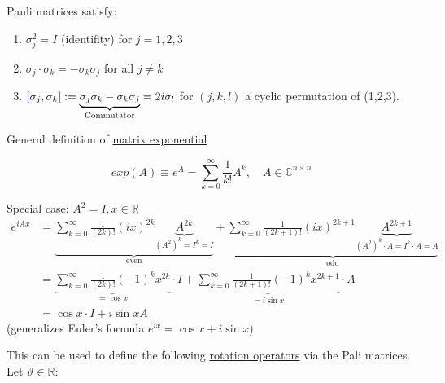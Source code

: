 Pauli matrices satisfy:
\begin{enumerate}
    \item $\sigma^{2}_{j} = I$ (identifity) for $j = 1,2,3$
    \item $\sigma_j \cdot \sigma_k = - \sigma_k \sigma_j$ for all $j \neq k$
    \item ${\color{blue} [} \sigma_j, \sigma_k {\color{blue} ]} :=
        \underbrace{\sigma_j \sigma_k - \sigma_k \sigma_j}_{\text{Commutator}} = 
        2 i \sigma_l$ for $(j,k,l)$ a cyclic permutation of (1,2,3).
\end{enumerate}

General definition of \underline{matrix exponential}

\begin{equation}
    exp(A) \equiv e^A = \sum_{k = 0}^{\infty} \frac{1}{k!}A^k, \quad A \in \mathbb{C}^{n \times n}
\end{equation}

Special case: $A^2 = I, x \in \mathbb{R}$
\begin{align*}
    e^{i A x} &= \underbrace{\sum_{k = 0}^{\infty} \frac{1}{(2k)!} (ix)^{2k} 
        \underbrace{A^{2k}}_{(A^2)^k = I^k = I}}_\text{even} +
        \underbrace{\sum_{k = 0}^{\infty} \frac{1}{(2k + 1)!} (ix)^{2k + 1} 
            \underbrace{A^{2k+1}}_{(A^2)^k \cdot A = I^k \cdot A= A}}_\text{odd} \\
        &= \underbrace{\sum_{k = 0}^{\infty} \frac{1}{(2k)!} (-1)^k x^{2k}}_{ = \cos{x}} \cdot I +
        \underbrace{\sum_{k = 0}^{\infty} \frac{1}{(2k + 1)!} (-1)^k x^{2k + 1}}_{=i \sin{x}} \cdot A\\
        &= \cos{x} \cdot I + i \sin{x} A
\end{align*}
(generalizes Euler's formula $e^{ix} = \cos{x} + i \sin{x}$)
\newline

This can be used to define the following \underline{rotation operators} via the
Pali matrices. Let $\vartheta \in \mathbb{R}$:

